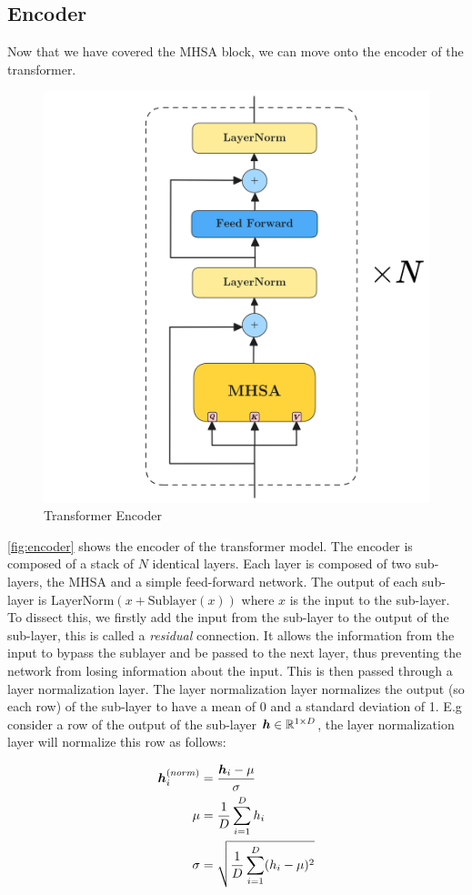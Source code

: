 \documentclass[../main.tex]{subfiles}
\begin{document}
\subsection{Encoder}

Now that we have covered the MHSA block, we can move onto the encoder of the transformer.

\begin{figure}[H]
	\centering
	\includegraphics[height=0.5\textwidth]{./figures/transformer/encoder.png}
	\caption{Transformer Encoder \cite{vaswani2017attention}}
	\label{fig:encoder}
\end{figure}

\autoref{fig:encoder} shows the encoder of the transformer model. The encoder is composed of a stack of $N$ identical layers. Each layer is composed of two sub-layers, the MHSA and a simple feed-forward network. The output of each sub-layer is $\text{LayerNorm}(x + \text{Sublayer}(x))$ where $x$ is the input to the sub-layer. To dissect this, we firstly add the input from the sub-layer to the output of the sub-layer, this is called a \emph{residual} connection. It allows the information from the input to bypass the sublayer and be passed to the next layer, thus preventing the network from losing information about the input. This is then passed through a layer normalization layer. The layer normalization layer normalizes the output (so each row) of the sub-layer to have a mean of 0 and a standard deviation of 1. E.g consider a row of the output of the sub-layer $\bm{h} \in \mathbb{R}^{1 \times D}$, the layer normalization layer will normalize this row as follows:

\begin{align*}
	\bm{h}_{i}^{(norm)} & =  \frac{\bm{h}_i - \mu}{\sigma}\\
	\mu &= \frac{1}{D}\sum_{i=1}^{D} h_i\\
	\sigma &= \sqrt{\frac{1}{D}\sum_{i=1}^{D} (h_i - \mu)^2}
\end{align*}
\end{document}
